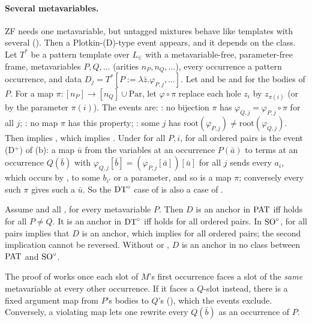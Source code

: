 \paragraph{Several metavariables.} ZF needs one metavariable, but untagged mixtures behave like templates with several
(). Then a Plotkin-(D)-type event appears, and it depends on the class. Let $T^*$ be a pattern template
over $L_\in$ with a metavariable-free, parameter-free frame, metavariables $P,Q,\dots$ (arities $n_P,n_Q,\dots$),
every occurrence a pattern occurrence, and data $D_j=T^*[P:=\lambda\bar z.\varphi_{P,j},\dots]$. Let  and
 be \evR{} and  for the bodies of $P$. For a map $\pi:[n_P]\to[n_Q]\cup\mathrm{Par}$, let
$\varphi\circ\pi$ replace each hole $z_i$ by $z_{\pi(i)}$ (or by the parameter $\pi(i)$). The events are:
: no bijection $\pi$ has $\varphi_{Q,j}=\varphi_{P,j}\circ\pi$ for all $j$;
: no map $\pi$ has this property;
: some $j$ has $\mathrm{root}(\varphi_{P,j})\ne\mathrm{root}(\varphi_{Q,j})$.
Then  implies , which implies . Under  for all $P,i$, 
for all ordered pairs is the event (D$^+$) of (b): a map $\bar u$ from the variables at an
occurrence $P(\bar a)$ to terms at an occurrence $Q(\bar b)$ with $\varphi_{Q,j}[\bar b]=(\varphi_{P,j}[\bar a])[\bar
u]$ for all $j$ sends every $a_i$, which occurs by , to some $b_{i'}$ or a parameter, and so is a map $\pi$;
conversely every such $\pi$ gives such a $\bar u$. So the $\mathrm{DT}^{\circ}$ case of  is also a case of .

\begin{theorem}\label{thm:zf:multi}
Assume  and all , for every metavariable $P$. Then $D$ is an anchor in $\mathrm{PAT}$ iff  holds
for all $P\ne Q$. It is an anchor in $\mathrm{DT}^{\circ}$ iff  holds for all ordered pairs. In $\mathrm{SO}^{\circ}$, \zfDroot{} for
all pairs implies that $D$ is an anchor, which implies \zfDdt{} for all ordered pairs; the second implication cannot
be reversed. Without  or , $D$ is an anchor in no class between $\mathrm{PAT}$ and $\mathrm{SO}^{\circ}$.
\end{theorem}
The proof of  works once each slot of $M$'s first occurrence faces a slot of the \emph{same}
metavariable at every other occurrence. If it faces a $Q$-slot instead, there is a fixed argument map from $P$'s
bodies to $Q$'s (), which the events exclude. Conversely, a violating map lets one rewrite every
$Q(\bar b)$ as an occurrence of $P$.

